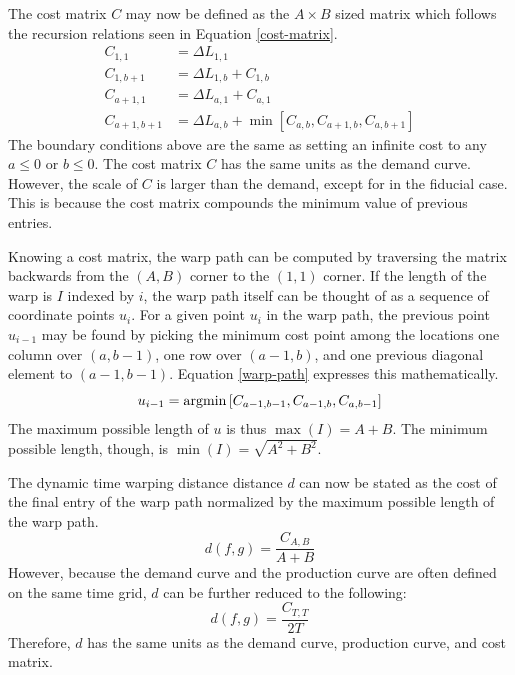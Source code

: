 The cost matrix $C$ may now be defined as the $A\times B$ sized matrix
which follows the recursion relations seen in Equation \ref{cost-matrix}.
\begin{equation}
\label{cost-matrix}
\begin{split}
C_{1,1} & = \Delta L_{1,1}\\
C_{1,b+1} & = \Delta L_{1,b} + C_{1,b}\\
C_{a+1,1} & = \Delta L_{a,1} + C_{a,1}\\
C_{a+1,b+1} & = \Delta L_{a,b} + \min\left[C_{a,b}, C_{a+1,b}, C_{a,b+1}\right]
\end{split}
\end{equation}
The boundary conditions above are the same as setting an infinite cost to
any $a \le 0$ or $b \le 0$. The cost matrix $C$ has the same units as the
demand curve. However, the scale of $C$ is
larger than the demand,
except for in the fiducial case. This is because the cost matrix compounds the
minimum value of previous entries.

Knowing a cost matrix, the warp path can be computed by traversing the
matrix backwards from the $(A, B)$ corner to the $(1, 1)$ corner.
If the length of the warp is $I$ indexed by $i$, the warp path itself
can be thought of as a sequence of coordinate points $u_i$. For a given
point $u_i$ in the warp path, the previous point $u_{i-1}$ may be found by
picking the minimum cost point among the locations one column over $(a,b-1)$,
one row over $(a-1,b)$, and one previous diagonal element to $(a-1,b-1)$.
Equation \ref{warp-path} expresses this mathematically.
\begin{equation}
\label{warp-path}
u_{i-1} = \mathrm{argmin}\left[C_{a-1,b-1}, C_{a-1,b}, C_{a,b-1}\right]
\end{equation}
The maximum possible length of $u$ is thus $\max(I) = A + B$.
The minimum possible length, though, is $\min(I) = \sqrt{A^2 + B^2}$.

The dynamic time warping distance distance $d$ can now be stated as the
cost of the final entry of the warp path normalized by the maximum possible
length of the warp path.
\begin{equation}
\label{d-calc-ab}
d(f, g) = \frac{C_{A,B}}{A + B}
\end{equation}
However, because the demand curve and the production curve
are often defined on the same time grid, $d$ can be further
reduced to the following:
\begin{equation}
\label{d-calc}
d(f, g) = \frac{C_{T,T}}{2T}
\end{equation}
Therefore, $d$ has the same units as the demand curve, production curve,
and cost matrix.

